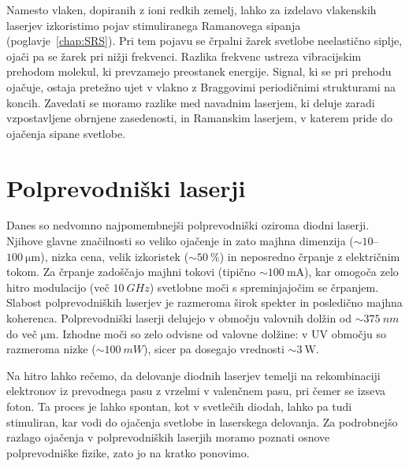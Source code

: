 \begin{remark}
 Namesto vlaken, dopiranih z ioni redkih zemelj, lahko za izdelavo vlakenskih laserjev
 izkoristimo pojav stimuliranega Ramanovega sipanja (poglavje~\ref{chap:SRS}). 
 Pri tem pojavu se črpalni žarek svetlobe neelastično siplje, ojači pa se žarek 
 pri nižji frekvenci. Razlika frekvenc ustreza vibracijskim prehodom 
 molekul, ki prevzamejo preostanek energije. Signal, ki se pri prehodu ojačuje, 
 ostaja pretežno ujet v vlakno z Braggovimi periodičnimi strukturami na koncih.
 Zavedati se moramo razlike med navadnim laserjem, ki deluje zaradi vzpostavljene
 obrnjene zasedenosti, in Ramanskim laserjem, v katerem pride do ojačenja sipane
 svetlobe.
\end{remark}

\section{Polprevodniški laserji}
\label{chap:SCL}
Danes so nedvomno najpomembnejši polprevodniški oziroma diodni 
laserji. Njihove glavne značilnosti so veliko ojačenje in zato majhna 
dimenzija ($\sim 10$--$100~\si{\micro\metre}$), nizka cena, 
velik izkoristek ($\sim 50~\%$) in neposredno črpanje z električnim tokom. 
Za črpanje zadoščajo majhni tokovi 
(tipično $\sim 100~\si{\milli\ampere}$), kar omogoča zelo hitro modulacijo (več $10~\si{GHz}$)
svetlobne moči s spreminjajočim se črpanjem. Slabost polprevodniških laserjev je razmeroma širok 
spekter in posledično majhna koherenca. Polprevodniški laserji delujejo v območju 
valovnih dolžin od $\sim 375~\si{nm}$ do več $\si{\micro\meter}$. Izhodne moči
so zelo odvisne od valovne dolžine: v UV območju so razmeroma nizke ($\sim 100~\si{mW}$),
sicer pa dosegajo vrednosti $\sim 3~\si{\watt}$.

Na hitro lahko rečemo, da delovanje diodnih laserjev temelji na rekombinaciji  
elektronov iz prevodnega pasu z vrzelmi v valenčnem pasu, pri čemer se izseva foton. Ta proces je lahko 
spontan, kot v svetlečih diodah, lahko pa tudi stimuliran, kar vodi do ojačenja svetlobe 
in laserskega delovanja. Za podrobnejšo razlago ojačenja v polprevodniških 
laserjih moramo poznati osnove polprevodniške fizike, zato jo na kratko ponovimo.  

